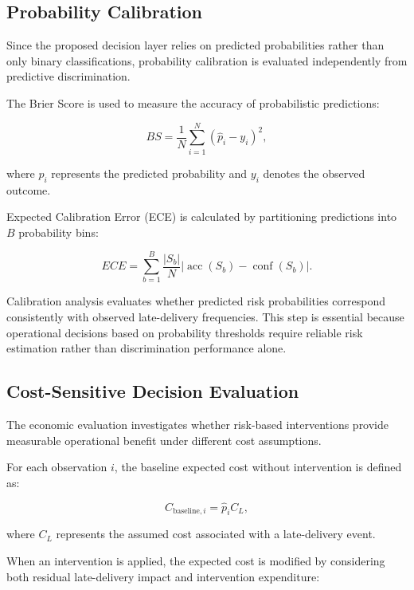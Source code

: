 \documentclass[11pt,a4paper]{article}
\begin{document}
\subsection{Probability Calibration}

Since the proposed decision layer relies on predicted probabilities rather than only binary classifications, probability calibration is evaluated independently from predictive discrimination.

The Brier Score is used to measure the accuracy of probabilistic predictions:

\begin{equation}
BS=
\frac{1}{N}
\sum_{i=1}^{N}
(\hat{p}_i-y_i)^2,
\end{equation}

where $\hat{p}_i$ represents the predicted probability and $y_i$ denotes the observed outcome.

Expected Calibration Error (ECE) is calculated by partitioning predictions into $B$ probability bins:

\begin{equation}
ECE=
\sum_{b=1}^{B}
\frac{|S_b|}{N}
\left|
\operatorname{acc}(S_b)
-
\operatorname{conf}(S_b)
\right|.
\end{equation}

Calibration analysis evaluates whether predicted risk probabilities correspond consistently with observed late-delivery frequencies. This step is essential because operational decisions based on probability thresholds require reliable risk estimation rather than discrimination performance alone.


\subsection{Cost-Sensitive Decision Evaluation}

The economic evaluation investigates whether risk-based interventions provide measurable operational benefit under different cost assumptions.

For each observation $i$, the baseline expected cost without intervention is defined as:

\begin{equation}
C_{\mathrm{baseline},i}
=
\hat{p}_i C_L,
\end{equation}

where $C_L$ represents the assumed cost associated with a late-delivery event.

When an intervention is applied, the expected cost is modified by considering both residual late-delivery impact and intervention expenditure:
\end{document}
